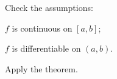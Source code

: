 \documentclass{article}
\begin{document}
\begin{steps}
  \item Check the assumptions:
    \begin{conditions}
      \item $f$ is continuous on $[a,b]$;
      \item $f$ is differentiable on $(a,b)$.
    \end{conditions}
  \item Apply the theorem.
\end{steps}
\end{document}
